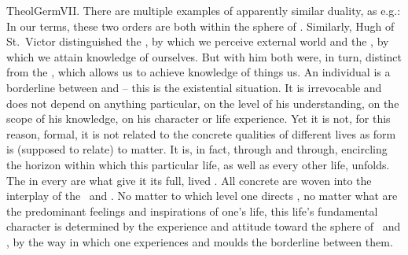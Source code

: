 \pa
\citet{Now the created soul of man hath [...] two eyes. The one
  is the power of seeing into eternity, the other of seeing into time and the
  creatures, of perceiving how they differ from each other [...], of giving life
  and needful things to the body, and ordering and governing it for the
  best.}{TheolGerm}{VII. There are multiple examples of apparently similar
  duality, as e.g.:  In our terms, these two orders
 are both within the sphere of . Similarly, Hugh of St.~Victor
  distinguished the , by which we perceive external world
  and the , by which we attain knowledge of
  ourselves. But with him both were, in turn, distinct 
  from the , which allows us to achieve knowledge of
  things  us. 
}
%
An individual is a borderline between  and  -- this is
the existential situation. It is irrevocable and does not depend on anything
particular, on the level of his understanding, on the scope of his knowledge, on
his character or life experience.  Yet it is not, for this reason, formal, it is
not related to the concrete qualities of different lives as form is (supposed to
relate) to matter.  It is, in fact,  through and through,
encircling the horizon within which this particular life, as well as every other
life, unfolds. The  in every  are what give
it its full, lived .  All concrete  are woven
into the interplay of the \LL\ and \HH.  No matter to which level one directs
, no matter what are the predominant feelings and inspirations of
one's life, this life's fundamental character is determined by the experience
and attitude toward the sphere of \HH\ and \LL, by the way in which one
experiences and moulds the borderline between them.

%
%

